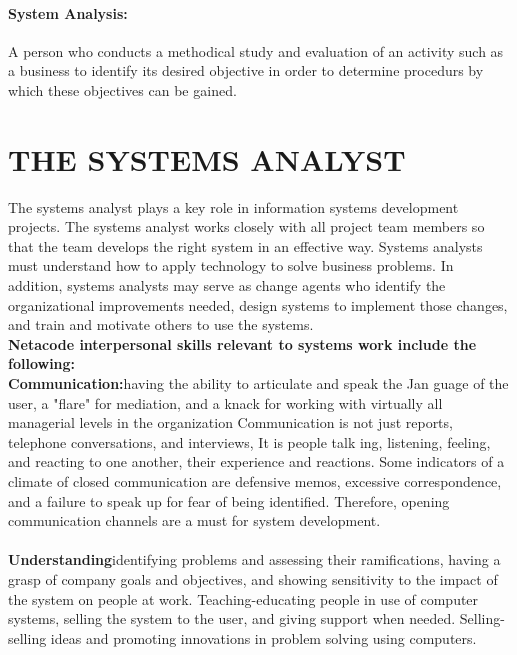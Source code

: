 \documentclass[a4paper,12pt]{report}
\begin{document}
\paragraph{System Analysis:} 
A person who conducts a methodical study and evaluation of an activity such as a business to identify its desired objective in order to determine procedurs by which these objectives can be gained.
\section{THE SYSTEMS ANALYST}
The systems analyst plays a key role in information systems development projects. The systems analyst works closely with all project team members so that the team develops the right system in an effective way. Systems analysts must understand how to apply technology to solve business problems. In addition, systems analysts may serve as change agents who identify the organizational improvements needed, design systems to implement those changes, and train and motivate others to use the systems.\\
\textbf{Netacode interpersonal skills relevant to systems work include the following: }\\
\textbf{Communication:}having the ability to articulate and speak the Jan guage of the user, a "flare" for mediation, and a knack for working with virtually all managerial levels in the organization Communication is not just reports, telephone conversations, and interviews, It is people talk ing, listening, feeling, and reacting to one another, their experience and reactions. Some indicators of a climate of closed communication are defensive memos, excessive correspondence, and a failure to speak up for fear of being identified. Therefore, opening communication channels are a must for system development.\\  \\
\textbf{Understanding}identifying problems and assessing their ramifications, having a grasp of company goals and objectives, and showing sensitivity to the impact of the system on people at work.
Teaching-educating people in use of computer systems, selling the system to the user, and giving support when needed. Selling-selling ideas and promoting innovations in problem solving using computers.
\end{document}
